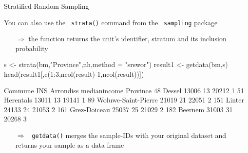 \documentclass[11pt,german,hideothersubsections]{beamer}
\newcommand{\R}[1]{{\tt \color{blue}  #1}}
\begin{document}
\begin{frame}[fragile]{Stratified Random Sampling}
\footnotesize{
You can also use the \R{strata()} command from the \R{sampling} package
\begin{itemize}
\item[$\Rightarrow$] the function returns the unit's identifier, stratum and its inclusion probability
\end{itemize}
\begin{Schunk}
\begin{Sinput}
 s <- strata(bm,"Province",nh,method = "srswor")
 result1 <- getdata(bm,s)
 head(result1[,c(1:3,ncol(result)-1,ncol(result))])
\end{Sinput}
\begin{Soutput}
                Commune   INS Arrondiss medianincome Province
48               Dessel 13006        13        20212        1
51            Herentals 13011        13        19141        1
89  Woluwe-Saint-Pierre 21019        21        22051        2
151              Linter 24133        24        21053        2
161        Grez-Doiceau 25037        25        21029        2
182             Beernem 31003        31        20268        3
\end{Soutput}
\end{Schunk}
\begin{itemize}
\item[$\Rightarrow$] \R{getdata()} merges the sample-IDs with your original dataset and returns your sample as a data frame
\end{itemize}
}
\end{frame}
\end{document}
